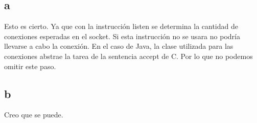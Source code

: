 \documentclass{article}
\begin{document}
		\subsection{a}
			Esto es cierto. Ya que con la instrucción listen se determina la cantidad de conexiones esperadas en el socket. Si esta instrucción no se usara no podría llevarse a cabo la conexión.
			En el caso de Java, la clase utilizada para las conexiones abstrae la tarea de la sentencia accept de C. Por lo que no podemos omitir este paso.
		\subsection{b}
		Creo que se puede. 
			
\end{document}

